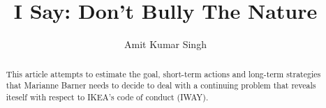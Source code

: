 \documentclass[11pt, a4paper]{IEEEtran}
\begin{document}
\title{I Say: Don't Bully The Nature}
\author{Amit Kumar Singh}
\maketitle

\renewcommand{\abstractname}{Executive Summary}
\begin{abstract}
This article attempts to estimate the goal, short-term actions and long-term strategies that Marianne Barner needs to decide to deal with a continuing problem that reveals iteself with respect to IKEA's code of conduct (IWAY).
\end{abstract}
\end{document}

